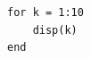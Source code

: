 \documentclass{article}
\begin{document}
\begin{lstlisting}[style=MatlabStyle]
for k = 1:10
    disp(k)
end
\end{lstlisting}
\end{document}
